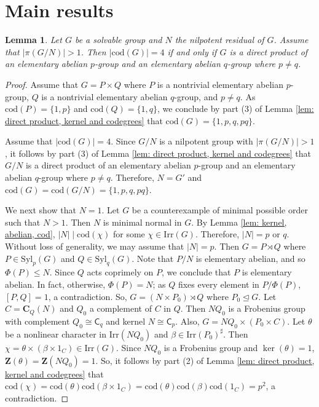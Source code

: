\documentclass[9pt]{article}
\newtheorem{lem}{\bf Lemma}[section]
\begin{document}
\section{Main results}

\begin{lem}\label{lem: nilpotent}
  Let $G$ be a solvable group and $N$ the nilpotent residual of $G$.
  Assume that $|\pi(G/N)|>1$.
  Then $|\mathrm{cod}(G)|=4$ if and only if $G$ is a direct product of an elementary abelian $p$-group
  and an elementary abelian $q$-group where $p\neq q$.
\end{lem}
\begin{proof}
  Assume that $G=P\times Q$ where $P$ is a nontrivial elementary abelian $p$-group, $Q$ is 
  a nontrivial elementary abelian $q$-group, and $p\neq q$.
  As $\mathrm{cod}(P)=\{ 1,p \}$ and $\mathrm{cod}(Q)=\{ 1,q \}$,
  we conclude by part (3) of Lemma \ref{lem: direct product, kernel and codegrees} that $\mathrm{cod}(G)=\{ 1,p,q,pq \}$.

  Assume that $|\mathrm{cod}(G)|=4$.
  Since $G/N$ is a nilpotent group with $|\pi(G/N)|>1$,
  it follows by part (3) of Lemma \ref{lem: direct product, kernel and codegrees} that $G/N$ is a direct product of an elementary abelian $p$-group
  and an elementary abelian $q$-group where $p\neq q$.
  Therefore, $N=G'$ and $\mathrm{cod}(G)=\mathrm{cod}(G/N)=\{ 1,p,q,pq \}$.
  
  We next show that $N=1$.
  Let $G$ be a counterexample of minimal possible order such that $N>1$.
 Then $N$ is minimal normal in $G$.
  By Lemma \ref{lem: kernel, abelian, cod}, $|N|\mid \mathrm{cod}(\chi)$ for some $\chi \in \mathrm{Irr}(G)$.
  Therefore, $|N|=p$ or $q$.
  Without loss of generality,
  we may assume that $|N|=p$.
  Then $G=P  \rtimes Q$ where $P\in \mathrm{Syl}_{p}(G)$ and $Q\in \mathrm{Syl}_{q}(G)$.
  Note that $P/N$ is elementary abelian,
  and so $\Phi(P)\leq N$.
  Since $Q$ acts coprimely on $P$, we conclude that $P$ is elementary abelian.
  In fact, otherwise, $\Phi(P)=N$; as $Q$ fixes every element in $P/\Phi(P)$, $[P,Q]=1$, a contradiction.
  So, $G=(N\times P_0) \rtimes Q$ where $P_0\unlhd G$.
  Let $C=\mathbf{C}_{Q}(N)$ and $Q_0$ a complement of $C$ in $Q$.
  Then $NQ_0$ is a Frobenius group with complement $Q_0\cong \mathsf{C}_{q}$ and kernel $N\cong \mathsf{C}_{p}$.
  Also, $G= NQ_0 \times (P_0\times C)$.
  Let $\theta$ be a nonlinear character in $\mathrm{Irr}(NQ_0)$ and $\beta\in \mathrm{Irr}(P_0)^\sharp$.
  Then $\chi=\theta \times (\beta\times 1_C) \in \mathrm{Irr}(G)$.
  Since $NQ_0$ is a Frobenius group and $\ker(\theta)=1$,
  $\mathbf{Z}(\theta)=\mathbf{Z}(NQ_0)=1$.
  So, it follows by part (2) of Lemma \ref{lem: direct product, kernel and codegrees} that 
  $\mathrm{cod}(\chi)=\mathrm{cod}(\theta)\mathrm{cod}(\beta\times 1_C)=\mathrm{cod}(\theta)\mathrm{cod}(\beta)\mathrm{cod}(1_C)=p^{2}$,
  a contradiction.
\end{proof}
\end{document}
